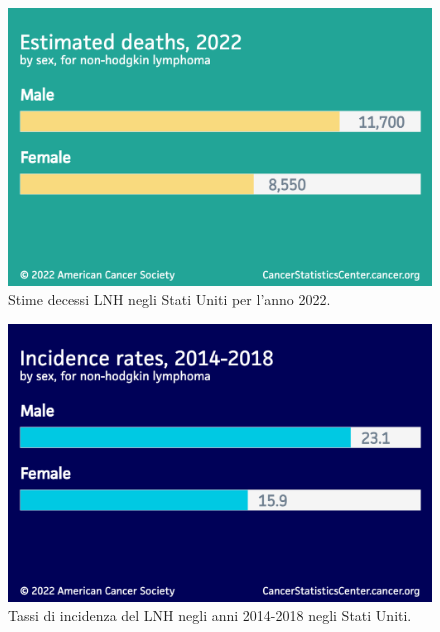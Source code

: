 \begin{figure}[h]
    \begin{center}
    \includegraphics[width=0.6\columnwidth]{img/Estimated deaths, 2022 (by sex).png}
    \end{center}
    \caption[Stime decessi LNH negli Stati Uniti per l’anno 2022.]{Stime decessi LNH negli Stati Uniti per l’anno 2022.
    \cite{img9}}

\end{figure}

\begin{figure}[h]
    \begin{center}
    \includegraphics[width=0.6\columnwidth]{img/Incidence rates, 2014-2018 (by sex).png}
    \end{center}
    \caption[Tassi di incidenza del LNH negli anni 2014-2018 negli Stati Uniti.]{Tassi di incidenza del LNH negli anni 2014-2018 negli Stati Uniti.
    \cite{img10}}

\end{figure}

